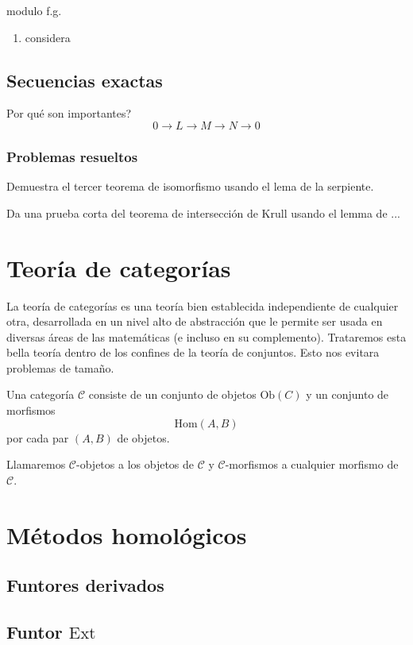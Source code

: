 \documentclass[b5paper,10pt]{book}
\begin{document}
\begin{defi}
modulo f.g.
\end{defi}

\begin{ej}
\begin{enumerate}[label=(i)]
	\item considera
\end{enumerate}
\end{ej}

\section{Secuencias exactas}

Por qué son importantes?
\[
0\to L \to M\to N\to 0
\]

\subsection{Problemas resueltos}

\begin{problema}
Demuestra el tercer teorema de isomorfismo usando el lema de la serpiente.
\end{problema}

\begin{problema}
Da una prueba corta del teorema de intersección de Krull usando el
lemma de ... 
\end{problema}

\chapter{Teoría de categorías}

La teoría de categorías 
es una teoría bien establecida 
independiente de cualquier otra,
desarrollada en un nivel alto de abstracción
que le permite ser usada en diversas áreas 
de las matemáticas (e incluso en su complemento).
Trataremos esta bella teoría dentro de los confines
de la teoría de conjuntos.
Esto nos evitara problemas de tamaño.

\begin{defi}
Una categoría \(\mathcal{C}\) consiste de un conjunto de objetos
\(\mathrm{Ob}(C)\) y un conjunto de morfismos
\[
\mathrm{Hom}(A,B)
\]
por cada par \((A,B)\) de objetos.
\end{defi}

Llamaremos \(\mathcal{C}\)-objetos a los 
objetos de \(\mathcal{C}\) y \(\mathcal{C}\)-morfismos a 
cualquier morfismo de \(\mathcal{C}\).

\chapter{Métodos homológicos}

\section{Funtores derivados}

\section{Funtor \(\mathrm{Ext}\)}
\end{document}

